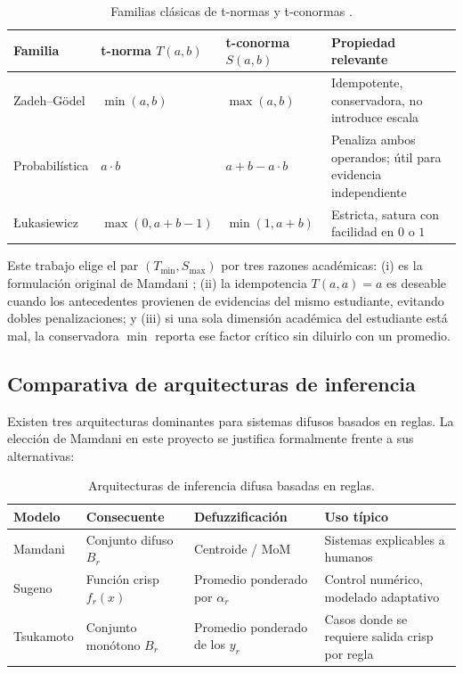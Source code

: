 \begin{table}[H]
  \centering
  \small
  \begin{tabularx}{0.96\linewidth}{l l l X}
    \toprule
    \textbf{Familia} & \textbf{t-norma $T(a,b)$} & \textbf{t-conorma $S(a,b)$} & \textbf{Propiedad relevante}\\
    \midrule
    Zadeh--Gödel & $\min(a,b)$ & $\max(a,b)$ & Idempotente, conservadora, no introduce escala\\
    Probabilística & $a\cdot b$ & $a+b-a\cdot b$ & Penaliza ambos operandos; útil para evidencia independiente\\
    Łukasiewicz & $\max(0,a+b-1)$ & $\min(1,a+b)$ & Estricta, satura con facilidad en $0$ o $1$\\
    \bottomrule
  \end{tabularx}
  \caption{Familias clásicas de t-normas y t-conormas \citep{klir1995fuzzy,ross2010fuzzy}.}
  \label{tab:tnorms}
\end{table}

Este trabajo elige el par $(T_{\min},S_{\max})$ por tres razones académicas: (i) es la formulación original de Mamdani \citep{mamdani1975experiment}; (ii) la idempotencia $T(a,a)=a$ es deseable cuando los antecedentes provienen de evidencias del mismo estudiante, evitando dobles penalizaciones; y (iii) si una sola dimensión académica del estudiante está mal, la conservadora $\min$ reporta ese factor crítico sin diluirlo con un promedio.

\subsection{Comparativa de arquitecturas de inferencia}
\label{sec:arquitecturas}

Existen tres arquitecturas dominantes para sistemas difusos basados en reglas. La elección de Mamdani en este proyecto se justifica formalmente frente a sus alternativas:

\begin{table}[H]
  \centering
  \small
  \begin{tabularx}{0.96\linewidth}{l X X X}
    \toprule
    \textbf{Modelo} & \textbf{Consecuente} & \textbf{Defuzzificación} & \textbf{Uso típico}\\
    \midrule
    Mamdani \citep{mamdani1975experiment} & Conjunto difuso $B_r$ & Centroide / MoM & Sistemas explicables a humanos\\
    Sugeno \citep{takagi1985fuzzy,sugeno1985industrial} & Función crisp $f_r(x)$ & Promedio ponderado por $\alpha_r$ & Control numérico, modelado adaptativo\\
    Tsukamoto & Conjunto monótono $B_r$ & Promedio ponderado de los $y_r$ & Casos donde se requiere salida crisp por regla\\
    \bottomrule
  \end{tabularx}
  \caption{Arquitecturas de inferencia difusa basadas en reglas.}
  \label{tab:arquitecturas}
\end{table}

